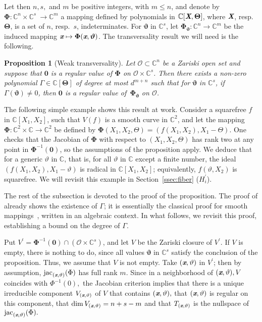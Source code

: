 \documentclass[a4paper]{article}
\def\sO{\mathscr{O}}
\def\Xb{\textit{\textbf{X}}}
\def\Thetab{\bm{\Theta}}
\def\thetab{\bm{\vartheta}}
\def\xb{\textit{\textbf{x}}}
\def\vt{\vartheta}
\DeclareMathOperator{\jac}{jac}
\def\dt{s}
\def\C{\mathbb{C}}
\newtheorem{prop}[theorem]{Proposition}
\begin{document}
Let then $n,\dt,$ and $m$ be positive integers, with $m \le n$, and denote
by $\bm\Phi :\C^n \times \C^{\dt} ~ \rightarrow \C^{m}$ a mapping
defined by polynomials in $\C[\Xb,\Thetab]$, where $\Xb$,
resp.\ $\Thetab$, is a set of $n$, resp.\ $\dt$, indeterminates.  For
$\thetab$ in $\C^{\dt}$, let $\bm\Phi_{\thetab} : \C^n \rightarrow
\C^{m}$ be the induced mapping $\xb\mapsto \bm\Phi(\xb,\thetab)$.  The
transversality result we will need is the following.

\begin{prop} [Weak transversality]\label{prop:weak_t}
Let $\mathscr{O} \subset \C^n$ be a Zariski open set and suppose that $\bm 0$ is a regular value of $\bm\Phi$ on $\mathscr{O} \times \C^{s}$. Then there
    exists a non-zero polynomial $\Gamma \in \C[\Thetab]$ of degree at
    most $d^{m+n}$ such that for $\thetab$ in $\C^\dt$, if
    $\Gamma(\thetab)\ne 0$, then $\bm 0$ is a regular value
    of~$\bm\Phi_{\thetab}$ on $\mathscr{O}$.
\end{prop}

The following simple example shows this result at work. Consider a
squarefree $f$ in $\C[X_1,X_2]$, such that $V(f)$ is a smooth curve in
$\C^2$, and let the mapping $\bm\Phi:\C^2\times \C \to \C^2$ be
defined by $\bm\Phi(X_1,X_2,\Theta) = (f(X_1,X_2), X_1-\Theta)$. One
checks that the Jacobian of $\bm\Phi$ with respect to
$(X_1,X_2,\Theta)$ has rank two at any point in $\bm\Phi^{-1}(\bm 0)$,
so the assumptions of the proposition apply. We deduce that for a
generic $\vartheta$ in $\C$, that is, for all $\vartheta$ in $\C$
except a finite number, the ideal $(f(X_1,X_2), X_1-\vartheta)$ is
radical in $\C[X_1,X_2]$; equivalently, $f(\vartheta, X_2)$ is
squarefree. We will revisit this example in Section~\ref{ssec:fiber} ($H_i^{'}$).

The rest of the subsection is devoted to the proof of the proposition.
The proof of \cite[Theorem B.3]{TWT} already shows the existence of
$\Gamma$; it is essentially the classical proof for smooth
mappings~\cite[Section~3.7]{demazure2000bifurcations}, written in an
algebraic context. In what follows, we revisit this proof,
establishing a bound on the degree of $\Gamma$.

    Put $V^{'} = \bm\Phi^{-1}(\bm 0) \cap (\sO \times \C^s)$, and let $V$ be the Zariski closure of $V^{'}.$ If $V$ is empty, there is nothing to do, since all values $\thetab$ in $\C^\dt$ satisfy the conclusion of the proposition. Thus, we assume that $V$ is not empty. Take $(\xb, \vt)$ in $V^{'}$; then by assumption, $\jac_{(\xb,\vt)}(\Phi)$ has full rank $m$. Since in a neighborhood of $(\xb,\vt), V$ coincides with $\Phi^{-1}(0),$ the Jacobian criterion implies that there is a unique irreducible component $V_{(\xb,\vt)}$ of $V$ that contains $(\xb,\vt),$ that $(\xb,\vt)$ is regular on this component, that $\dim V_{(\xb,\vt)}=n+s-m$ and that $T_{(\xb,\vt)}$ is the nullspace of $\jac_{(\xb,\vt)}(\Phi).$
    
\end{document}
